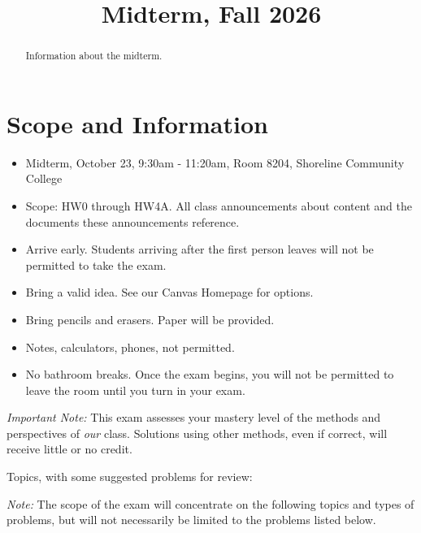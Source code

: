 \documentclass{ximera}
\title{Midterm, Fall 2026}
\begin{document}
\begin{abstract}
Information about the midterm.
\end{abstract}
\maketitle

\section{Scope and Information}

\begin{itemize}
\item Midterm, October 23, 9:30am - 11:20am, Room 8204, Shoreline Community College

\item Scope: HW0 through HW4A. All class announcements about content and the documents these announcements reference.

\item Arrive early. Students arriving after the first person leaves will not be permitted to take the exam.

\item Bring a valid idea. See our Canvas Homepage for options.

\item Bring pencils and erasers. Paper will be provided.

\item Notes, calculators, phones, not permitted.

\item No bathroom breaks. Once the exam begins, you will not be permitted to leave the room until you turn in your exam.
\end{itemize}

\emph{Important Note:} This exam assesses your mastery level of the methods and perspectives of \emph{our} class. Solutions using other methods, even if correct, will receive little or no credit.


Topics, with some suggested problems for review:

\emph{Note:} The scope of the exam will concentrate on the following topics and types of problems, but will not necessarily be limited to the problems listed below.
\end{document}
